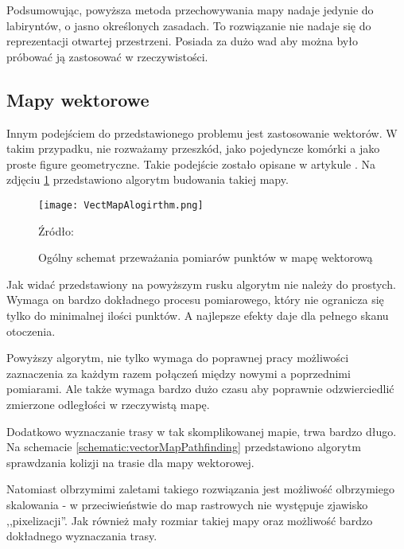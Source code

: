             Podsumowując, powyższa metoda przechowywania mapy nadaje jedynie do labiryntów, o jasno określonych zasadach.
            To rozwiązanie nie nadaje się do reprezentacji otwartej przestrzeni.
            Posiada za dużo wad aby można było próbować ją zastosować w rzeczywistości.

        \subsection{Mapy wektorowe}
            Innym podejściem do przedstawionego problemu jest zastosowanie wektorów.
            W takim przypadku, nie rozważamy przeszkód, jako pojedyncze komórki a jako proste figure geometryczne.
            Takie podejście zostało opisane w artykule \cite{vector_map}.
            Na zdjęciu \ref{fig:buildVectMap} przedstawiono algorytm budowania takiej mapy.

            \begin{figure}[!ht]
                \centering
                \texttt{[image: VectMapAlogirthm.png]}
                \caption{Ogólny schemat przeważania pomiarów punktów w mapę wektorową}
                Źródło: \cite{vector_map}
                \label{fig:buildVectMap}
            \end{figure}
            
            Jak widać przedstawiony na powyższym rusku algorytm nie należy do prostych.
            Wymaga on bardzo dokładnego procesu pomiarowego, który nie ogranicza się tylko do minimalnej ilości punktów.
            A najlepsze efekty daje dla pełnego skanu otoczenia.

            Powyższy algorytm, nie tylko wymaga do poprawnej pracy możliwości zaznaczenia za każdym razem połączeń między nowymi a poprzednimi pomiarami.
            Ale także wymaga bardzo dużo czasu aby poprawnie odzwierciedlić zmierzone odległości w rzeczywistą mapę.

            Dodatkowo wyznaczanie trasy w tak skomplikowanej mapie, trwa bardzo długo.
            Na schemacie \ref{schematic:vectorMapPathfinding} przedstawiono algorytm sprawdzania kolizji na trasie dla mapy wektorowej.

            

            Natomiast olbrzymimi zaletami takiego rozwiązania jest możliwość olbrzymiego skalowania - w przeciwieństwie do map rastrowych nie występuje zjawisko ,,pixelizacji''.
            Jak również mały rozmiar takiej mapy oraz możliwość bardzo dokładnego wyznaczania trasy.


